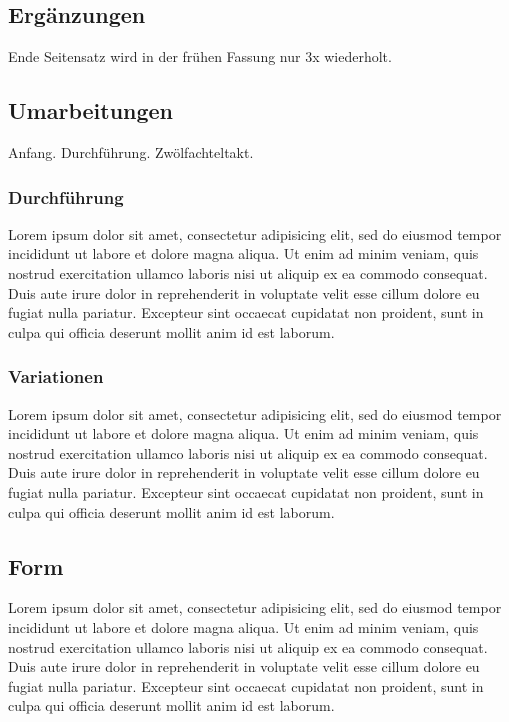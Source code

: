 \subsection{Ergänzungen}

Ende Seitensatz wird in der frühen Fassung nur 3x wiederholt.

\subsection{Umarbeitungen}

Anfang.
Durchführung.
Zwölfachteltakt.

\subsubsection{Durchführung}

Lorem ipsum dolor sit amet, consectetur adipisicing elit, sed do eiusmod tempor incididunt ut labore et dolore magna aliqua. Ut enim ad minim veniam, quis nostrud exercitation ullamco laboris nisi ut aliquip ex ea commodo consequat. Duis aute irure dolor in reprehenderit in voluptate velit esse cillum dolore eu fugiat nulla pariatur. Excepteur sint occaecat cupidatat non proident, sunt in culpa qui officia deserunt mollit anim id est laborum.

\subsubsection{Variationen}

Lorem ipsum dolor sit amet, consectetur adipisicing elit, sed do eiusmod tempor incididunt ut labore et dolore magna aliqua. Ut enim ad minim veniam, quis nostrud exercitation ullamco laboris nisi ut aliquip ex ea commodo consequat. Duis aute irure dolor in reprehenderit in voluptate velit esse cillum dolore eu fugiat nulla pariatur. Excepteur sint occaecat cupidatat non proident, sunt in culpa qui officia deserunt mollit anim id est laborum.


\subsection{Form}

Lorem ipsum dolor sit amet, consectetur adipisicing elit, sed do eiusmod tempor incididunt ut labore et dolore magna aliqua. Ut enim ad minim veniam, quis nostrud exercitation ullamco laboris nisi ut aliquip ex ea commodo consequat. Duis aute irure dolor in reprehenderit in voluptate velit esse cillum dolore eu fugiat nulla pariatur. Excepteur sint occaecat cupidatat non proident, sunt in culpa qui officia deserunt mollit anim id est laborum.


